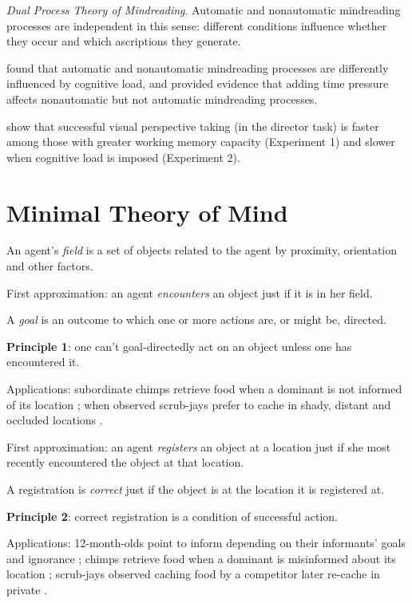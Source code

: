\documentclass[12pt]{extarticle}
\begin{document}
\begin{multicols*}{3}
\emph{Dual Process Theory of Mindreading}.
Automatic and nonautomatic mindreading processes are independent in
this sense: different conditions influence whether they occur and
which ascriptions they generate.

\citet{qureshi:2010_executive} found that automatic and nonautomatic
mindreading processes are differently influenced by cognitive load, and
\citet{todd:2016_dissociating} provided evidence that adding time pressure
affects nonautomatic but not automatic mindreading processes.

\citet{lin:2010_reflexively} show that successful visual perspective taking (in the
director task) is faster among those with greater working memory capacity (Experiment 1) and
slower when cognitive load is imposed (Experiment 2).



\section{Minimal Theory of Mind}

An agent’s \emph{field} is a set of objects related to the agent by proximity, orientation and other factors.

First approximation: an agent \emph{encounters} an object just if it is in her field.

A \emph{goal} is an outcome to which one or more actions are, or might be, directed.


\textbf{Principle 1}: one can’t goal-directedly act on an object unless one has encountered it.

Applications: subordinate chimps retrieve food when a dominant is not informed of its
          location \citep{Hare:2001ph}; when observed scrub-jays prefer to cache in shady, distant and
          occluded locations \citep{Dally:2004xf,Clayton:2007fh}.

First approximation: an agent \emph{registers} an object at a location just if she most recently encountered the object at that location.

A registration is \emph{correct} just if the object is at the location it is registered at.

\textbf{Principle 2}: correct registration is a condition of successful action.

Applications: 12-month-olds point to inform depending on their informants’ goals and ignorance \citep{Liszkowski:2008al};
          chimps retrieve food when a dominant is misinformed about its location \citep{Hare:2001ph};
          scrub-jays observed caching food by a competitor later re-cache in private \citep{Clayton:2007fh,Emery:2007ze}.


\end{multicols*}
\end{document}
